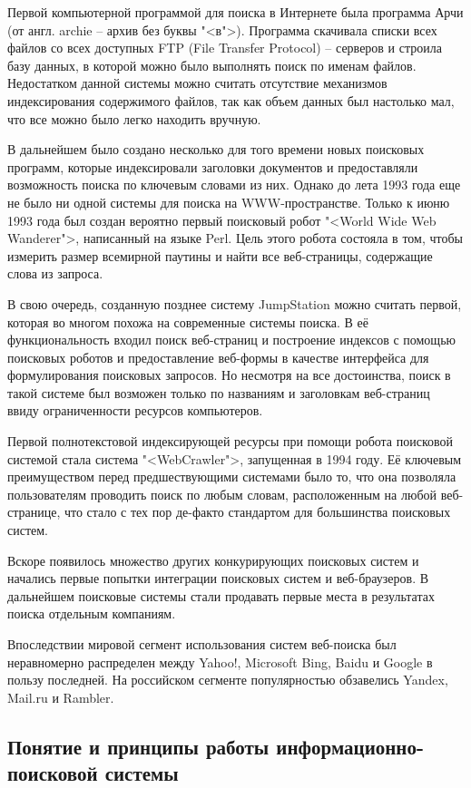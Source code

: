Первой компьютерной программой для поиска в Интернете была программа Арчи (от англ. archie -- архив без буквы "<в">). Программа скачивала списки всех файлов со всех доступных FTP (File Transfer Protocol) -- серверов и строила базу данных, в которой можно было выполнять поиск по именам файлов. Недостатком данной системы можно считать отсутствие механизмов индексирования содержимого файлов, так как объем данных был настолько мал, что все можно было легко находить вручную.

В дальнейшем было создано несколько для того времени новых поисковых программ, которые индексировали заголовки документов и предоставляли возможность поиска по ключевым словами из них. Однако до лета 1993 года еще не было ни одной системы для поиска на WWW-пространстве. Только к июню 1993 года был создан вероятно первый поисковый робот "<World Wide Web Wanderer">, написанный на языке Perl. Цель этого робота состояла в том, чтобы измерить размер всемирной паутины и найти все веб-страницы, содержащие слова из запроса.

В свою очередь, созданную позднее систему JumpStation можно считать первой, которая во многом похожа на современные системы поиска. В её функциональность входил поиск веб-страниц и построение индексов с помощью поисковых роботов и предоставление веб-формы в качестве интерфейса для формулирования поисковых запросов. Но несмотря на все достоинства, поиск в такой системе был возможен только по названиям и заголовкам веб-страниц ввиду ограниченности ресурсов компьютеров.

Первой полнотекстовой индексирующей ресурсы при помощи робота поисковой системой стала система "<WebCrawler">, запущенная в 1994 году. Её ключевым преимуществом перед предшествующими системами было то, что она позволяла пользователям проводить поиск по любым словам, расположенным на любой веб-странице, что стало с тех пор де-факто стандартом для большинства поисковых систем.

Вскоре появилось множество других конкурирующих поисковых систем и начались первые попытки интеграции поисковых систем и веб-браузеров. В дальнейшем поисковые системы стали продавать первые места в результатах поиска отдельным компаниям.

Впоследствии мировой сегмент использования систем веб-поиска был неравномерно распределен между Yahoo!, Microsoft Bing, Baidu и Google в пользу последней. На российском сегменте популярностью обзавелись Yandex, Mail.ru и Rambler.

\subsection{Понятие и принципы работы информационно-поисковой системы}

